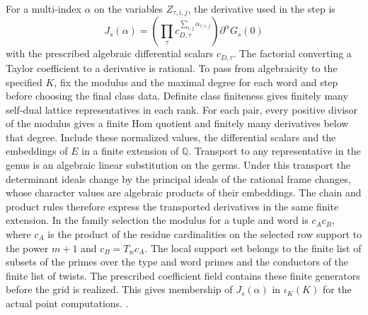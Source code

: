 For a multi-index \(\alpha\) on the variables \(Z_{\tau,i,j}\),
the derivative used in the step is
\[
 J_s(\alpha)=
    \left(\prod_\tau c_{D,\tau}^{\sum_{i,j}\alpha_{\tau,i,j}}\right)
    \partial^\alpha G_s(0)
\]
with the prescribed algebraic differential scalars \(c_{D,\tau}\).
The factorial converting a Taylor coefficient to a derivative
is rational. To pass from algebraicity to the specified \(K\),
fix the modulus and the maximal degree for each word and step
before choosing the final class data. Definite class finiteness
gives finitely many self-dual lattice representatives in each
rank. For each pair, every positive divisor of the modulus
gives a finite Hom quotient and finitely many derivatives
below that degree. Include these normalized values, the
differential scalars and the embeddings of \(E\) in a finite
extension of \(\mathbb Q\).
Transport to any representative in the genus is an algebraic
linear substitution on the germs. Under this transport the
determinant ideals change by the principal ideals of the
rational frame changes, whose character values are algebraic
products of their embeddings. The chain and product rules
therefore express the transported derivatives in the same
finite extension.
In the family selection the modulus for a tuple and word is
\(c_Ac_B\), where \(c_A\) is the product of the residue
cardinalities on the selected row support to the power \(m+1\)
and \(c_B=T_w c_A\). The local support set belongs to the finite
list of subsets of the primes over the type and word primes
and the conductors of the finite list of twists.
The prescribed coefficient field contains these finite generators
before the grid is realized. This gives membership of
\(J_s(\alpha)\) in \(\iota_K(K)\) for the actual point computations.
.

